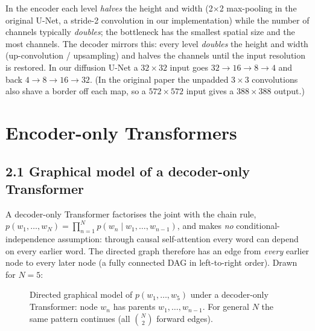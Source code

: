 \documentclass[11pt,a4paper]{article}
\begin{document}
In the encoder each level \emph{halves} the height and width (2$\times$2 max-pooling in the original U-Net, a stride-2 convolution in our implementation) while the number of channels typically \emph{doubles}; the bottleneck has the smallest spatial size and the most channels. The decoder mirrors this: every level \emph{doubles} the height and width (up-convolution / upsampling) and halves the channels until the input resolution is restored. In our diffusion U-Net a $32\times32$ input goes $32\to16\to8\to4$ and back $4\to8\to16\to32$. (In the original paper the unpadded $3\times3$ convolutions also shave a border off each map, so a $572\times572$ input gives a $388\times388$ output.)

\section{Encoder-only Transformers}

\subsection*{2.1 Graphical model of a decoder-only Transformer}

A decoder-only Transformer factorises the joint with the chain rule, $p(w_1,\dots,w_N)=\prod_{n=1}^{N}p(w_n\mid w_1,\dots,w_{n-1})$, and makes \emph{no} conditional-independence assumption: through causal self-attention every word can depend on every earlier word. The directed graph therefore has an edge from \emph{every} earlier node to every later node (a fully connected DAG in left-to-right order). Drawn for $N=5$:

\begin{figure}[H]
\centering
{}
\caption{Directed graphical model of $p(w_1,\dots,w_5)$ under a decoder-only Transformer: node $w_n$ has parents $w_1,\dots,w_{n-1}$. For general $N$ the same pattern continues (all $\binom{N}{2}$ forward edges).}
\end{figure}
\end{document}
